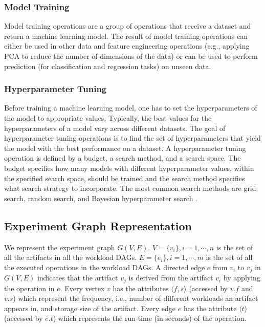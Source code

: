 \subsubsection{Model Training}
Model training operations are a group of operations that receive a dataset and return a machine learning model.
The result of model training operations can either be used in other data and feature engineering operations (e.g., applying PCA to reduce the number of dimensions of the data) or can be used to perform prediction (for classification and regression tasks) on unseen data.

\subsubsection{Hyperparameter Tuning}
Before training a machine learning model, one has to set the hyperparameters of the model to appropriate values.
Typically, the best values for the hyperparameters of a model vary across different datasets.
The goal of hyperparameter tuning operations is to find the set of hyperparameters that yield the model with the best performance on a dataset.
A hyperparameter tuning operation is defined by a budget, a search method, and a search space.
The budget specifies how many models with different hyperparameter values, within the specified search space, should be trained and the search method specifies what search strategy to incorporate.
The most common search methods are grid search, random search, and Bayesian hyperparameter search \cite{bergstra2012random,snoek2012practical}.


\subsection{Experiment Graph Representation}\label{sub-graph-construction}
We represent the experiment graph $G(V, E)$.
$V=\{v_i\}, i = 1, \cdots, n$ is the set of all the artifacts in all the workload DAGs.
$E=\{e_i\}, i = 1, \cdots, m$ is the set of all the executed operations in the workload DAGs.
A directed edge $e$ from $v_i$ to $v_j$ in $G(V, E)$ indicates that the artifact $v_j$ is derived from the artifact $v_i$ by applying the operation in $e$.
Every vertex $v$ has the attributes $\langle f, s \rangle$ (accessed by $v.f$ and $v.s$) which represent the frequency, i.e., number of different workloads an artifact appears in, and storage size of the artifact.
Every edge $e$ has the attribute $\langle t \rangle$ (accessed by $e.t$) which represents the run-time (in seconds) of the operation.


